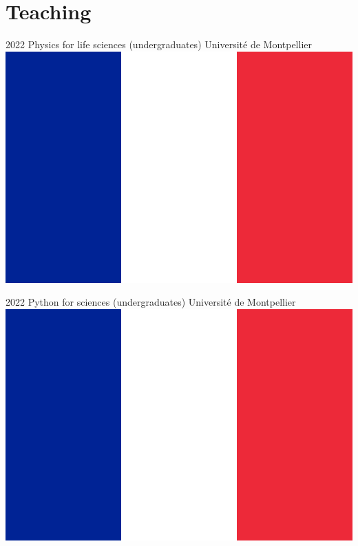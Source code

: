 \documentclass[letterpaper]{cvtemplate_en} %
\begin{document}
\section{Teaching}

\begin{cvbody}

\cvitem
	{2022}
	{}
	{Physics for life sciences (undergraduates)}
	{Université de Montpellier \includegraphics[height=0.8\myheight]{fr}\vspace{-5pt}}
	{}{}{}
	{}
	{\vspace{5pt}}

\cvitem
	{2022}
	{}
	{Python for sciences (undergraduates)}
	{Université de Montpellier \includegraphics[height=0.8\myheight]{fr}}
	{}{}{}
	{}
	{\vspace{5pt}}


\end{cvbody}
\end{document}
